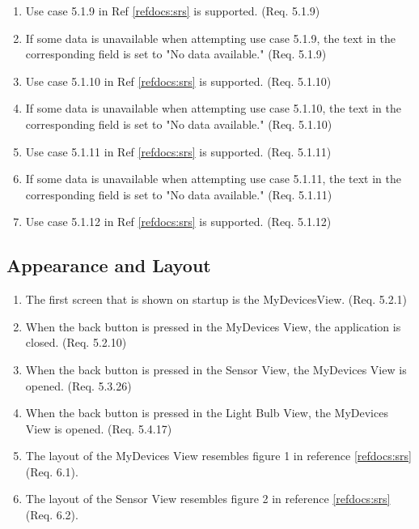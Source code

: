\documentclass[a4paper]{article}
\newlength{\testlabellength}
\newenvironment{testlist}{\begin{enumerate}[label=\bfseries Test \thesubsection.\arabic* , labelindent=0pt, labelwidth=\testlabellength , leftmargin=2cm]}{\end{enumerate}}
\begin{document}
\begin{appendices}
\begin{testlist}
	\item Use case 5.1.9 in Ref \ref{refdocs:srs} is supported. (Req. 5.1.9)
	
	\item If some data is unavailable when attempting use case 5.1.9, the text in the corresponding field is set to "No data available." (Req. 5.1.9)
	
	\item Use case 5.1.10 in Ref \ref{refdocs:srs} is supported. (Req. 5.1.10)
	
	\item If some data is unavailable when attempting use case 5.1.10, the text in the corresponding field is set to "No data available." (Req. 5.1.10)
	
	\item Use case 5.1.11 in Ref \ref{refdocs:srs} is supported. (Req. 5.1.11)
	
	\item If some data is unavailable when attempting use case 5.1.11, the text in the corresponding field is set to "No data available." (Req. 5.1.11)
	
	\item Use case 5.1.12 in Ref \ref{refdocs:srs} is supported. (Req. 5.1.12)
\end{testlist}

\subsection{Appearance and Layout}

\begin{testlist}
	\item The first screen that is shown on startup is the MyDevicesView. (Req. 5.2.1)
	
	\item When the back button is pressed in the MyDevices View, the application is closed. (Req. 5.2.10)	
	
	\item When the back button is pressed in the Sensor View, the MyDevices View is opened. (Req. 5.3.26)
	
	\item When the back button is pressed in the Light Bulb View, the MyDevices View is opened. (Req. 5.4.17)
	
	\item The layout of the MyDevices View resembles figure 1 in reference \ref{refdocs:srs} (Req. 6.1).
	
	\item The layout of the Sensor View resembles figure 2 in reference \ref{refdocs:srs} (Req. 6.2).
	

\end{testlist}
\end{appendices}
\end{document}
